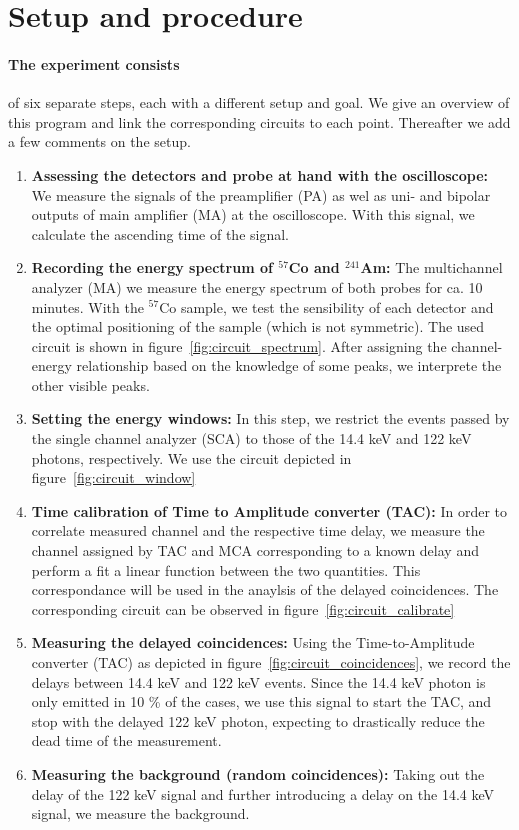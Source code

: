 \section{Setup and procedure}
\paragraph{The experiment consists}
of six separate steps, each with a different setup and goal. 
We give an overview of this program and link the corresponding circuits to 
each point. Thereafter we add a few comments on the setup. 
\begin{enumerate}
    \item 
        \textbf{Assessing the detectors and probe at hand with the oscilloscope:}
        We measure the signals of the preamplifier (PA) as wel as uni- and bipolar outputs of 
        main amplifier (MA) at the oscilloscope. With this signal, we calculate the ascending time 
        of the signal.
    \item 
        \label{it:task2}
        \textbf{Recording the energy spectrum of $^{57}$Co and $^{241}$Am:}
        The multichannel analyzer (MA) we measure the energy spectrum of both probes 
        for ca. 10 minutes. With the $^{57}$Co sample, we test the sensibility of each detector
        and the optimal positioning of the sample (which is not symmetric). 
        The used circuit is shown in figure~\ref{fig:circuit_spectrum}. After assigning the 
        channel-energy relationship based on the knowledge of some peaks, we interprete the other visible peaks.
    \item
        \textbf{Setting the energy windows:}
        In this step, we restrict the events passed by the single channel analyzer (SCA) to those 
        of the 14.4 keV and 122 keV photons, respectively. We use the circuit depicted in figure~\ref{fig:circuit_window}
    \item
        \textbf{Time calibration of Time to Amplitude converter (TAC):}
        In order to correlate measured channel and the respective time delay, we measure the channel 
        assigned by TAC and MCA corresponding to a known delay and perform a fit a linear function between 
        the two quantities. This correspondance will be used in the anaylsis of the delayed coincidences. 
        The corresponding circuit can be observed in figure~\ref{fig:circuit_calibrate}
    \item
        \textbf{Measuring the delayed coincidences:}
        Using the Time-to-Amplitude converter (TAC) as depicted in figure~\ref{fig:circuit_coincidences}, 
        we record the delays between 14.4 keV and 122 keV 
        events. Since the 14.4 keV photon is only emitted in 10 \% of the cases, we use this signal to start the 
        TAC, and stop with the delayed 122 keV photon, expecting to drastically reduce the dead time of the 
        measurement.
    \item
        \textbf{Measuring the background (random coincidences):}
        Taking out the delay of the 122 keV signal and further introducing a delay on the 14.4 keV signal, 
        we measure the background. 
\end{enumerate}

